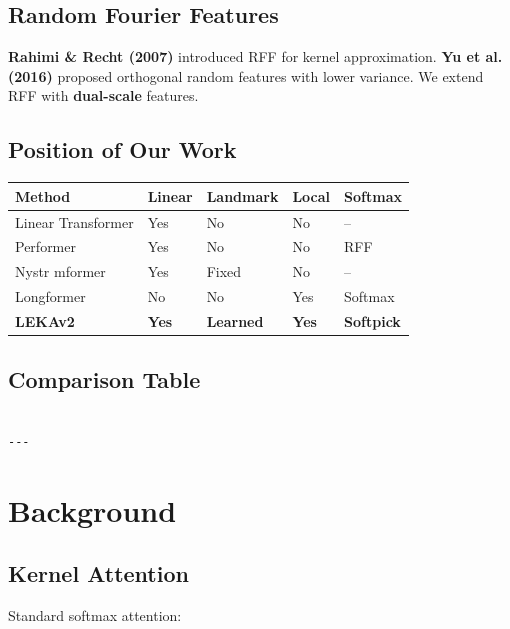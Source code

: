 \subsection{Random Fourier Features}

\textbf{Rahimi \& Recht (2007)} introduced RFF for kernel approximation. 
\textbf{Yu et al. (2016)} proposed orthogonal random features with lower 
variance. We extend RFF with \textbf{dual-scale} features.

\subsection{Position of Our Work}

\begin{table}[H]
\centering
\small
\begin{tabular}{lllll}
\toprule
\textbf{Method} & \textbf{Linear} & \textbf{Landmark} & \textbf{Local} & \textbf{Softmax} \\
\midrule
Linear Transformer & Yes & No & No & -- \\
Performer & Yes & No & No & RFF \\
Nystr mformer & Yes & Fixed & No & -- \\
Longformer & No & No & Yes & Softmax \\
\textbf{LEKAv2} & \textbf{Yes} & \textbf{Learned} & \textbf{Yes} & \textbf{Softpick} \\
\bottomrule
\end{tabular}
\end{table}



\subsection{Comparison Table}

\begin{lstlisting}

---
\end{lstlisting}

\section{Background}

\subsection{Kernel Attention}

Standard softmax attention:

